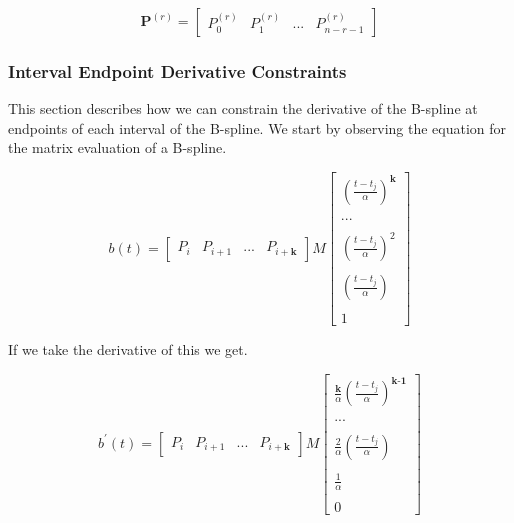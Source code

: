 \documentclass{article}
\begin{document}
\begin{equation}
    \textbf{P}^{(r)} = \begin{bmatrix}
    P_0^{(r)} & P_1^{(r)} & ... & P_{n-r-1}^{(r)}
    \end{bmatrix}
\end{equation}

\subsubsection{Interval Endpoint Derivative Constraints}

This section describes how we can constrain the derivative of the B-spline at endpoints of each interval of the B-spline. We start by observing the equation for the matrix evaluation of a B-spline.

\begin{equation}
    b(t) = \begin{bmatrix} P_{i} & P_{i+1} & ... & P_{i+\textbf{k}}\end{bmatrix} M \begin{bmatrix} (\frac{t-t_j}{\alpha})^\textbf{k} \\ \\ ... \\ \\ (\frac{t-t_j}{\alpha})^2 \\ \\ (\frac{t-t_j}{\alpha}) \\ \\ 1 \end{bmatrix}
\end{equation}

If we take the derivative of this we get.

\begin{equation}
    b^{\prime}(t) = \begin{bmatrix} P_{i} & P_{i+1} & ... & P_{i+\textbf{k}}\end{bmatrix} M \begin{bmatrix} \frac{\textbf{k}}{\alpha} (\frac{t-t_j}{\alpha})^\textbf{k-1} \\ \\ ... \\ \\ \frac{2}{\alpha}(\frac{t-t_j}{\alpha}) \\ \\ \frac{1}{\alpha} \\ \\ 0 \end{bmatrix}
\end{equation}
\end{document}
